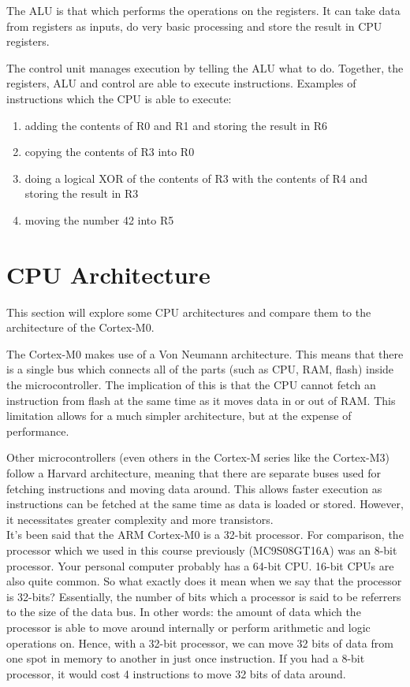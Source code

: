 The ALU is that which performs the operations on the registers. It can take data from registers as inputs, do very basic processing and store the result in CPU registers. 

The control unit manages execution by telling the ALU what to do. Together, the registers, ALU and control are able to execute instructions. 
Examples of instructions which the CPU is able to execute:
\begin{enumerate}
  \item adding the contents of R0 and R1 and storing the result in R6
  \item copying the contents of R3 into R0
  \item doing a logical XOR of the contents of R3 with the contents of R4 and storing the result in R3
  \item moving the number 42 into R5
\end{enumerate}


\section{CPU Architecture}
This section will explore some CPU architectures and compare them to the architecture of the Cortex-M0.

The Cortex-M0 makes use of a Von Neumann architecture. This means that there is a single bus which connects all of the parts (such as CPU, RAM, flash)  inside the microcontroller. The implication of this is that the CPU cannot fetch an instruction from flash at the same time as it moves data in or out of RAM. This limitation allows for a much simpler architecture, but at the expense of performance. 

Other microcontrollers (even others in the Cortex-M series like the Cortex-M3) follow a Harvard architecture, meaning that there are separate buses used for fetching instructions and moving data around. This allows faster execution as instructions can be fetched at the same time as data is loaded or stored. However, it necessitates greater complexity and more transistors. \\

It's been said that the ARM Cortex-M0 is a 32-bit processor. For comparison, the processor which we used in this course previously (MC9S08GT16A) was an 8-bit processor. Your personal computer probably has a 64-bit CPU. 16-bit CPUs are also quite common. So what exactly does it mean when we say that the processor is 32-bits? Essentially, the number of bits which a processor is said to be referrers to the size of the data bus. In other words: the amount of data which the processor is able to move around internally or perform arithmetic and logic operations on. Hence, with a 32-bit processor, we can move 32 bits of data from one spot in memory to another in just once instruction. If you had a 8-bit processor, it would cost 4 instructions to move 32 bits of data around.  

